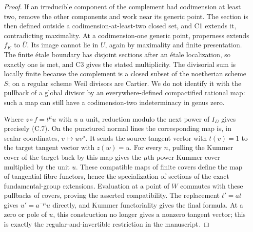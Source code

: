\begin{proof}
If an irreducible component of the complement had codimension at least
two, remove the other components and work near its generic point. The
section is then defined outside a codimension-at-least-two closed set,
and C1 extends it, contradicting maximality. At a codimension-one
generic point, properness extends $f_K$ to $\bar U$. Its image cannot
lie in $U$, again by maximality and finite presentation. The finite
\'etale boundary has disjoint sections after an \'etale localization,
so exactly one is met, and C3 gives the stated multiplicity. The
divisorial sum is locally finite because the complement is a closed
subset of the noetherian scheme $S$; on a regular scheme Weil
divisors are Cartier. We do not identify it with the pullback of a
global divisor by an everywhere-defined compactified rational map:
such a map can still have a codimension-two indeterminacy in genus
zero.

Where $z\circ f=t^\mu u$ with $u$ a unit, reduction modulo the next
power of $I_D$ gives precisely (C.7). On the punctured normal lines
the corresponding map is, in scalar coordinates, $v\mapsto u v^\mu$.
It sends the source tangent vector with $t(v)=1$ to the target tangent
vector with $z(w)=u$. For every $n$, pulling the Kummer cover of the
target back by this map gives the $\mu$th-power Kummer cover multiplied
by the unit $u$. These compatible maps of finite covers define the
map of tangential fibre functors, hence the specialization of sections
of the exact fundamental-group extensions. Evaluation at a point of
$W$ commutes with these pullbacks of covers, proving the asserted
compatibility. The replacement $t'=at$ gives
$u'=a^{-\mu}u$ directly, and Kummer functoriality gives the final
formula. At a zero or pole of $u$, this construction no longer gives
a nonzero tangent vector; this is exactly the regular-and-invertible
restriction in the manuscript.
\end{proof}
